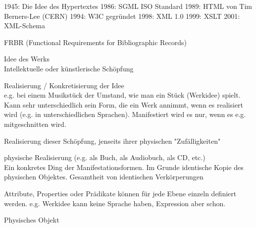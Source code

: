 



1945: Die Idee des Hypertextes
1986: SGML ISO Standard
1989: HTML von Tim Berners-Lee (CERN)
1994: W3C gegründet
1998: XML 1.0
1999: XSLT
2001: XML-Schema




\begin{frame}{FRBR (Functional Requirements for
Bibliographic Records)}

 Idee des Werks \\
Intellektuelle oder künstlerische Schöpfung

 Realisierung / Konkretisierung der Idee \\
e.g. bei einem Musikstück der Umstand, wie man ein Stück (Werkidee) spielt. Kann sehr unterschiedlich sein 
Form, die ein Werk annimmt, wenn es realisiert wird (e.g. in unterschiedlichen Sprachen).
Manifestiert wird es nur, wenn es e.g. mitgeschnitten wird.

Realisierung dieser Schöpfung, jenseits ihrer
physischen "Zufälligkeiten"

 physische Realisierung (e.g. als Buch, als Audiobuch, als CD, etc.) \\
 Ein konkretes Ding der Manifestationsformen. Im Grunde identische Kopie des physischen Objektes.
Gesamtheit von identischen Verkörperungen

Attribute, Properties oder Prädikate können für jede Ebene einzeln definiert werden. e.g. Werkidee kann keine Sprache haben, Expression aber schon. 

Physisches Objekt
\end{frame}

